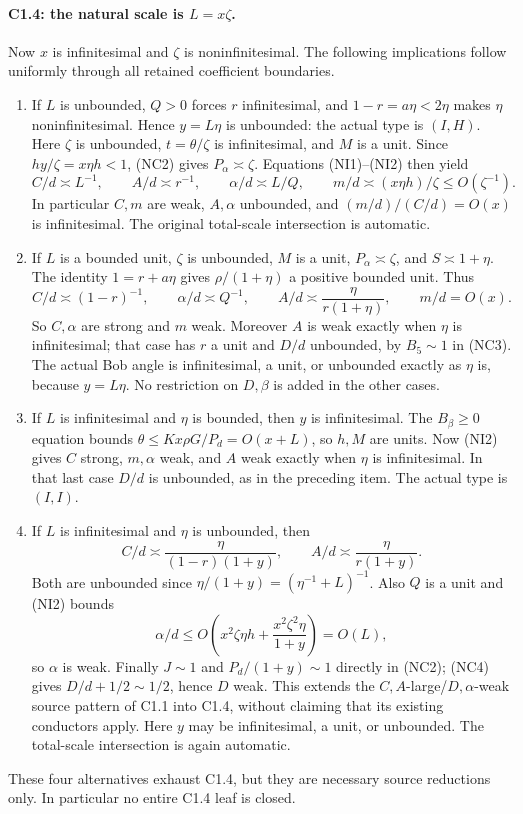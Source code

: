 \paragraph{C1.4: the natural scale is $L=x\zeta$.}
Now $x$ is infinitesimal and $\zeta$ is noninfinitesimal.
The following implications follow uniformly through all retained
coefficient boundaries.
\begin{enumerate}
\item If $L$ is unbounded, $Q>0$ forces $r$ infinitesimal, and
$1-r=a\eta<2\eta$ makes $\eta$ noninfinitesimal. Hence $y=L\eta$
is unbounded: the actual type is $(I,H)$. Here $\zeta$ is unbounded,
$t=\theta/\zeta$ is infinitesimal, and $M$ is a unit. Since
$h y/\zeta=x\eta h<1$, (NC2) gives $P_\alpha\asymp\zeta$.
Equations (NI1)--(NI2) then yield
\[
 C/d\asymp L^{-1},\qquad
 A/d\asymp r^{-1},\qquad
 \alpha/d\asymp L/Q,\qquad
 m/d\asymp (x\eta h)/\zeta\le O(\zeta^{-1}).
 \tag{NI4}
\]
In particular $C,m$ are weak, $A,\alpha$ unbounded, and
$(m/d)/(C/d)=O(x)$ is infinitesimal. The original total-scale
intersection is automatic.

\item If $L$ is a bounded unit, $\zeta$ is unbounded, $M$ is a
unit, $P_\alpha\asymp\zeta$, and $S\asymp1+\eta$. The identity
$1=r+a\eta$ gives $\rho/(1+\eta)$ a positive bounded unit.
Thus
\[
 C/d\asymp(1-r)^{-1},\qquad
 \alpha/d\asymp Q^{-1},\qquad
 A/d\asymp\frac{\eta}{r(1+\eta)},\qquad
 m/d=O(x).
 \tag{NI5}
\]
So $C,\alpha$ are strong and $m$ weak. Moreover $A$ is weak
exactly when $\eta$ is infinitesimal; that case has $r$ a unit and
$D/d$ unbounded, by $B_5\sim1$ in (NC3). The actual Bob angle is
infinitesimal, a unit, or unbounded exactly as $\eta$ is, because
$y=L\eta$. No restriction on $D,\beta$ is added in the other cases.

\item If $L$ is infinitesimal and $\eta$ is bounded, then $y$ is
infinitesimal. The $B_\beta\ge0$ equation bounds
$\theta\le Kx\rho G/P_d=O(x+L)$, so $h,M$ are units.
Now (NI2) gives $C$ strong, $m,\alpha$ weak, and $A$ weak exactly
when $\eta$ is infinitesimal. In that last case $D/d$ is unbounded,
as in the preceding item. The actual type is $(I,I)$.

\item If $L$ is infinitesimal and $\eta$ is unbounded, then
\[
 C/d\asymp\frac{\eta}{(1-r)(1+y)},\qquad
 A/d\asymp\frac{\eta}{r(1+y)}.                    \tag{NI6}
\]
Both are unbounded since $\eta/(1+y)=(\eta^{-1}+L)^{-1}$.
Also $Q$ is a unit and (NI2) bounds
\[
 \alpha/d\le O\!\left(x^2\zeta\eta h+
              \frac{x^2\zeta^2\eta}{1+y}\right)=O(L),
\]
so $\alpha$ is weak. Finally $J\sim1$ and
$P_d/(1+y)\sim1$ directly in (NC2); (NC4) gives
$D/d+1/2\sim1/2$, hence $D$ weak. This extends the
$C,A$-large/$D,\alpha$-weak source pattern of C1.1 into C1.4,
without claiming that its existing conductors apply. Here $y$ may
be infinitesimal, a unit, or unbounded. The total-scale intersection
is again automatic.
\end{enumerate}
These four alternatives exhaust C1.4, but they are necessary source
reductions only. In particular no entire C1.4 leaf is closed.

